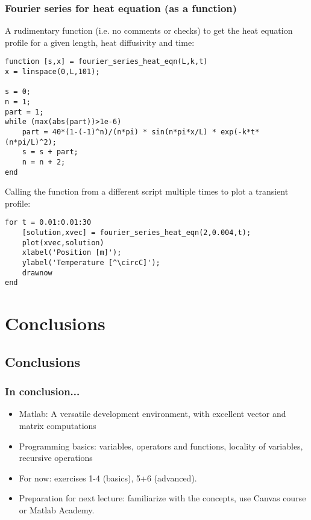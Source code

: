 \begin{frame}[fragile]
 \frametitle{Fourier series for heat equation (as a function)}
A rudimentary function (i.e. no comments or checks) to get the heat equation profile for a given length, heat diffusivity and time:
  \begin{lstlisting}
function [s,x] = fourier_series_heat_eqn(L,k,t)
x = linspace(0,L,101);

s = 0;
n = 1;
part = 1;
while (max(abs(part))>1e-6)
    part = 40*(1-(-1)^n)/(n*pi) * sin(n*pi*x/L) * exp(-k*t*(n*pi/L)^2);
    s = s + part;
    n = n + 2;
end
  \end{lstlisting}
  
Calling the function from a different script multiple times to plot a transient profile:
\begin{lstlisting}
for t = 0.01:0.01:30
    [solution,xvec] = fourier_series_heat_eqn(2,0.004,t);
    plot(xvec,solution)
    xlabel('Position [m]');
    ylabel('Temperature [^\circC]');
    drawnow
end
\end{lstlisting}
\end{frame}

\section{Conclusions}
\subsection*{Conclusions}
\begin{frame}[fragile]
  \frametitle{In conclusion...}
  \begin{itemize}
     \item Matlab: A versatile development environment, with excellent vector and matrix computations
     \item Programming basics: variables, operators and functions, locality of variables, recursive operations
  \end{itemize}
  \pause
    \begin{itemize}
     \item For now: exercises 1-4 (basics), 5+6 (advanced).
     \item Preparation for next lecture: familiarize with the concepts, use Canvas course or Matlab Academy.
  \end{itemize}
\end{frame}


% 



